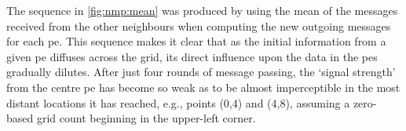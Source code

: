 The sequence in \cref{fig:nmp:mean} was produced by using the mean of the messages received from the other neighbours when computing the new outgoing messages for each \gls{pe}.  This sequence makes it clear that as the initial information from a given \gls{pe} diffuses across the grid, its direct influence upon the data in the \glspl{pe} gradually dilutes.  After just four rounds of message passing, the `signal strength' from the centre \gls{pe} has become so weak as to be almost imperceptible in the most distant locations it has reached, e.g., points (0,4) and (4,8), assuming a zero-based grid count beginning in the upper-left corner.